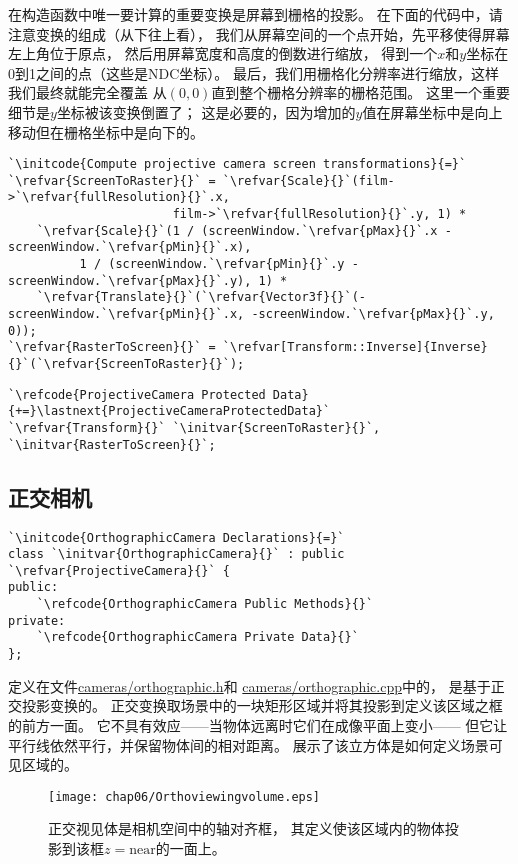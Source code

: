 在构造函数中唯一要计算的重要变换是屏幕到栅格的投影。
在下面的代码中，请注意变换的组成（从下往上看），
我们从屏幕空间的一个点开始，先平移使得屏幕左上角位于原点，
然后用屏幕宽度和高度的倒数进行缩放，
得到一个$x$和$y$坐标在0到1之间的点（这些是NDC坐标）。
最后，我们用栅格化分辨率进行缩放，这样我们最终就能完全覆盖
从$(0,0)$直到整个栅格分辨率的栅格范围。
这里一个重要细节是$y$坐标被该变换倒置了；
这是必要的，因为增加的$y$值在屏幕坐标中是向上移动但在栅格坐标中是向下的。
\begin{lstlisting}
`\initcode{Compute projective camera screen transformations}{=}`
`\refvar{ScreenToRaster}{}` = `\refvar{Scale}{}`(film->`\refvar{fullResolution}{}`.x, 
                       film->`\refvar{fullResolution}{}`.y, 1) *
    `\refvar{Scale}{}`(1 / (screenWindow.`\refvar{pMax}{}`.x - screenWindow.`\refvar{pMin}{}`.x),
          1 / (screenWindow.`\refvar{pMin}{}`.y - screenWindow.`\refvar{pMax}{}`.y), 1) *
    `\refvar{Translate}{}`(`\refvar{Vector3f}{}`(-screenWindow.`\refvar{pMin}{}`.x, -screenWindow.`\refvar{pMax}{}`.y, 0));
`\refvar{RasterToScreen}{}` = `\refvar[Transform::Inverse]{Inverse}{}`(`\refvar{ScreenToRaster}{}`);
\end{lstlisting}
\begin{lstlisting}
`\refcode{ProjectiveCamera Protected Data}{+=}\lastnext{ProjectiveCameraProtectedData}`
`\refvar{Transform}{}` `\initvar{ScreenToRaster}{}`, `\initvar{RasterToScreen}{}`;
\end{lstlisting}

\subsection{正交相机}\label{sub:正交相机}
\begin{lstlisting}
`\initcode{OrthographicCamera Declarations}{=}`
class `\initvar{OrthographicCamera}{}` : public `\refvar{ProjectiveCamera}{}` {
public:
    `\refcode{OrthographicCamera Public Methods}{}`
private:
    `\refcode{OrthographicCamera Private Data}{}`
};
\end{lstlisting}

定义在文件\href{https://github.com/mmp/pbrt-v3/blob/master/src/cameras/orthographic.h}{\ttfamily cameras/orthographic.h}和
\href{https://github.com/mmp/pbrt-v3/tree/master/src/cameras/orthographic.cpp}{\ttfamily cameras/orthographic.cpp}中的，
是基于正交投影变换的。
正交变换取场景中的一块矩形区域并将其投影到定义该区域之框的前方一面。
它不具有效应——当物体远离时它们在成像平面上变小——
但它让平行线依然平行，并保留物体间的相对距离。
展示了该立方体是如何定义场景可见区域的。
\begin{figure}[htbp]
    \centering\texttt{[image: chap06/Orthoviewingvolume.eps]}
    \caption{正交视见体是相机空间中的轴对齐框，
        其定义使该区域内的物体投影到该框$z=\text{near}$的一面上。}
    \label{fig:6.2}
\end{figure}

